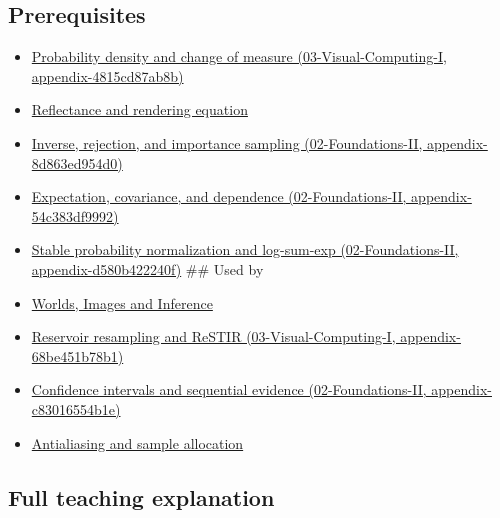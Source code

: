 \subsection{Prerequisites}\label{appendix-031e02bf28af-prerequisites}

\begin{itemize}
\item
  \href{../03-Visual-Computing-I/main.pdf\#nameddest=appendix-4815cd87ab8b}{Probability density and change of measure (03-Visual-Computing-I, appendix-4815cd87ab8b)}
\item
  \hyperref[appendix-96da0b153b77]{Reflectance and rendering equation}
\item
  \href{../02-Foundations-II/main.pdf\#nameddest=appendix-8d863ed954d0}{Inverse, rejection, and importance sampling (02-Foundations-II, appendix-8d863ed954d0)}
\item
  \href{../02-Foundations-II/main.pdf\#nameddest=appendix-54c383df9992}{Expectation, covariance, and dependence (02-Foundations-II, appendix-54c383df9992)}
\item
  \href{../02-Foundations-II/main.pdf\#nameddest=appendix-d580b422240f}{Stable probability normalization and log-sum-exp (02-Foundations-II, appendix-d580b422240f)} \#\# Used by
\item
  \href{Continuous\%20Notes/University\%20-\%20Worlds,\%20Images\%20and\%20Inference\%20-\%20Graphics,\%20Vision\%20and\%20Photography}{Worlds, Images and Inference}
\item
  \href{../03-Visual-Computing-I/main.pdf\#nameddest=appendix-68be451b78b1}{Reservoir resampling and ReSTIR (03-Visual-Computing-I, appendix-68be451b78b1)}
\item
  \href{../02-Foundations-II/main.pdf\#nameddest=appendix-c83016554b1e}{Confidence intervals and sequential evidence (02-Foundations-II, appendix-c83016554b1e)}
\item
  \hyperref[appendix-4192b2bdd21e]{Antialiasing and sample allocation}
\end{itemize}

\subsection{Full teaching explanation}\label{appendix-031e02bf28af-full-teaching-explanation}

